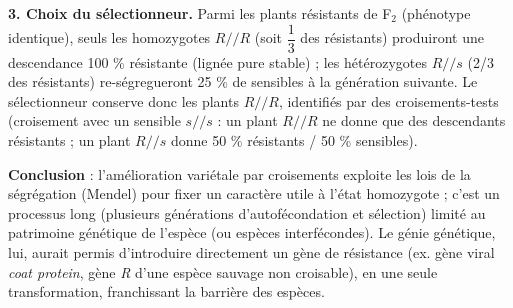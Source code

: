 \documentclass[11pt]{article}
\newcommand{\cle}[1]{{\popxbold\color{popdark}#1}}
\begin{document}
\begin{exoresolu}
\textbf{3. Choix du sélectionneur.} Parmi les plants résistants de F$_2$ (phénotype identique), seuls les homozygotes $R/\!/R$ (soit $\dfrac{1}{3}$ des résistants) produiront une descendance 100 \% résistante (lignée pure stable) ; les hétérozygotes $R/\!/s$ (2/3 des résistants) re-ségregueront 25 \% de sensibles à la génération suivante. Le sélectionneur conserve donc les plants $R/\!/R$, identifiés par des \cle{croisements-tests} (croisement avec un sensible $s/\!/s$ : un plant $R/\!/R$ ne donne que des descendants résistants ; un plant $R/\!/s$ donne 50 \% résistants / 50 \% sensibles).

\textbf{Conclusion} : l'amélioration variétale par croisements exploite les lois de la ségrégation (Mendel) pour fixer un caractère utile à l'état homozygote ; c'est un processus long (plusieurs générations d'autofécondation et sélection) limité au patrimoine génétique de l'espèce (ou espèces interfécondes). Le génie génétique, lui, aurait permis d'introduire directement un gène de résistance (ex. gène viral \emph{coat protein}, gène \emph{R} d'une espèce sauvage non croisable), en une seule transformation, franchissant la barrière des espèces.
\end{exoresolu}
\end{document}
